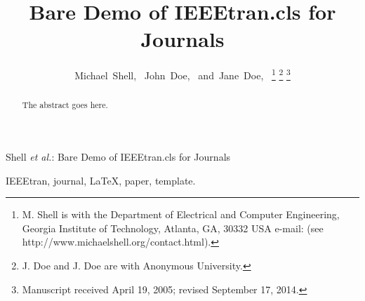 \documentclass[journal]{IEEEtran}
\begin{document}
%
\title{Bare Demo of IEEEtran.cls for Journals}
%
%
%

\author{Michael~Shell,~
        John~Doe,~
        and~Jane~Doe,~%
\thanks{M. Shell is with the Department
of Electrical and Computer Engineering, Georgia Institute of Technology, Atlanta,
GA, 30332 USA e-mail: (see http://www.michaelshell.org/contact.html).}%
\thanks{J. Doe and J. Doe are with Anonymous University.}%
\thanks{Manuscript received April 19, 2005; revised September 17, 2014.}}

%
{Shell \MakeLowercase{\textit{et al.}}: Bare Demo of IEEEtran.cls for Journals}
%


\maketitle

\begin{abstract}
The abstract goes here.
\end{abstract}

\begin{IEEEkeywords}
IEEEtran, journal, \LaTeX, paper, template.
\end{IEEEkeywords}
\end{document}
